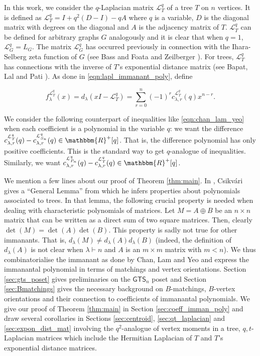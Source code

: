 \documentclass[12pt]{article}
\newcommand{\sL}{  \mathcal{ L}}
\newcommand{\RR}{ \mathbbm{R}}
\newcommand{\GTS}{\mathsf{GTS}}
\begin{document}
In this work, we consider the $q$-Laplacian matrix $\sL_T^q$ of a tree $T$ on $n$ vertices.  
It is defined as $\sL_T^q = I + q^2(D-I) - qA$ where $q$ is a variable, 
$D$ is the diagonal matrix with degrees on the diagonal and $A$ is the adjacency 
matrix of $T$.  $\sL_T^q$ can be defined for arbitrary graphs $G$ analogously
and it is clear that when $q=1$, $\sL_G^q = L_G$.  The matrix $\sL_G^q$ has 
occurred previously in connection with the Ihara-Selberg zeta function of $G$
(see Bass \cite{bass} and Foata and Zeilberger 
\cite{foata-zeilberger-bass-trams}). 
For trees, $\sL_T^q$ has connections with the inverse of $T$'s exponential
distance matrix (see Bapat, Lal and Pati \cite{bapat-lal-pati}).  As done in
\eqref{eqn:lapl_immanant_poly}, define

\begin{equation}
  \label{eqn:q-lapl_immanant_poly}
  f^{\sL_T^q}_{\lambda}(x) = d_{\lambda}(xI -\sL_T^q) = \sum_{r=0}^n (-1)^r c_{\lambda,r}^{\sL_T^q}(q) x^{n-r}.
\end{equation}

We consider the following counterpart of inequalities like 
\eqref{eqn:chan_lam_yeo} when each 
coefficient is a polynomial in the variable $q$:  we want the difference
$c_{\lambda,r}^{\sL_T^q}(q) - c_{\lambda,r}^{\sL_{S_n}^q}(q) \in \RR^+[q]$.  That
is, the difference polynomial has only positive coefficients.  This is 
the standard way to get $q$-analogue of inequalities.  Similarly, we want
$c_{\lambda,r}^{\sL_{P_n}^q}(q) - c_{\lambda,r}^{\sL_{T}^q}(q) \in \RR^+[q]$. 


We mention a few lines about our proof of Theorem \ref{thm:main}.  In 
\cite[Theorem 5.1]{csikvari-poset2}, Csikv{\'a}ri gives a ``General Lemma'' from
which he infers properties about polynomials associated to trees.  
In that lemma, the following crucial property is needed when 
dealing with characteristic polynomials of matrices.  Let $M= A \oplus B$
be an $n \times n$ matrix that can be written as a direct sum of two 
square matrices.  Then, clearly $\det(M) = \det(A) \det(B)$.  
This property is sadly not true for other immanants.  That is, 
$d_{\lambda}(M) \not= d_{\lambda}(A) d_{\lambda}(B)$ 
(indeed, the definition of 
$d_{\lambda}(A)$ is not clear 
when $\lambda \vdash n$ and $A$ is an $m \times m$ matrix with $m < n$).  
We thus combinatorialise the immanant as done by Chan, Lam and
Yeo \cite{chan_lam_yeo} and express the immanantal polynomial
in terms of matchings and vertex orientations.  
Section \ref{sec:gts_poset} gives preliminaries on the $\GTS_n$
poset and Section \ref{sec:Bmatchings} gives the necessary background on
$B$-matchings, $B$-vertex orientations and their connection
to coefficients of immanantal polynomials.  We give our proof of  Theorem \ref{thm:main}
in Section \ref{sec:coeff_imman_poly} and draw several corollaries
in Sections \ref{sec:centroid}, 
\ref{sec:qt_laplacian} 
and 
\ref{sec:expon_dist_mat} 
involving the $q^2$-analogue of 
vertex moments in a tree, $q,t$-Laplacian matrices which
include the Hermitian Laplacian of $T$ and $T$'s 
exponential distance matrices.
\end{document}
